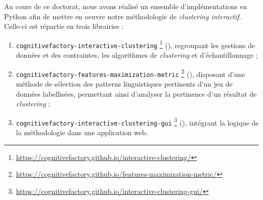 		Au cours de ce doctorat, nous avons réalisé un ensemble d'implémentations en Python afin de mettre en oeuvre notre méthodologie de \textit{clustering interactif}.
		Celle-ci est répartie en trois librairies :
		\begin{enumerate}
			\item \texttt{cognitivefactory-interactive-clustering} \footnote{
				\url{https://cognitivefactory.github.io/interactive-clustering/}
			} (\cite{schild:2022:cognitivefactory-interactiveclustering}), regroupant les gestions de données et des contraintes, les algorithmes de \textit{clustering} et d'échantillonnage ;
			\item \texttt{cognitivefactory-features-maximization-metric} \footnote{
				\url{https://cognitivefactory.github.io/features-maximization-metric/}
			} (\cite{schild:2023:cognitivefactory-featuresmaximizationmetric}), disposant d'une méthode de sélection des patterns linguistiques pertinents d'un jeu de données labellisées, permettant ainsi d'analyser la pertinence d'un résultat de \textit{clustering} ;
			\item \texttt{cognitivefactory-interactive-clustering-gui} \footnote{
				\url{https://cognitivefactory.github.io/interactive-clustering-gui/}
			} (\cite{schild-etal:2022:cognitivefactory-interactiveclusteringgui}), intégrant la logique de la méthodologie dans une application web.
		\end{enumerate}
		
